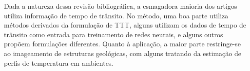 Dada a natureza dessa revisão bibliográfica, a esmagadora maioria dos artigos utiliza informação de tempo de trânsito. No método, uma boa parte utiliza métodos derivados da formulação de TTT, alguns utilizam os dados de tempo de trânsito como entrada para treinamento de redes neurais, e alguns outros propõem formulações diferentes. Quanto à aplicação, a maior parte restringe-se ao imageamento de estruturas geológicas, com alguns tratando da estimação de perfis de temperatura em ambientes.
